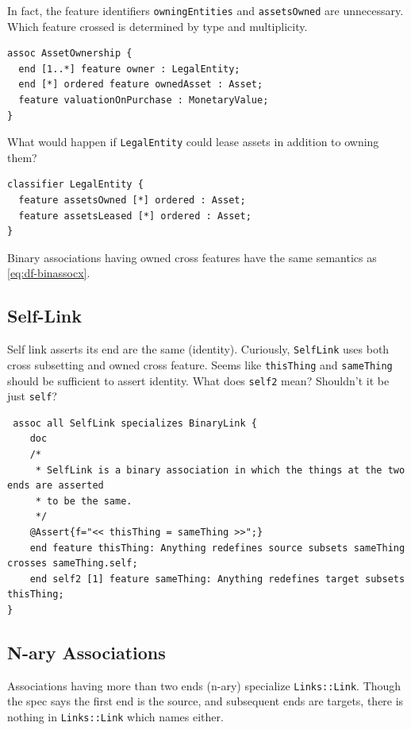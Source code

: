 \pn In fact, the feature identifiers \texttt{owningEntities} and \texttt{assetsOwned} are unnecessary.  
Which feature crossed is determined by type and multiplicity.

\begin{lstlisting}
assoc AssetOwnership {
  end [1..*] feature owner : LegalEntity;
  end [*] ordered feature ownedAsset : Asset;
  feature valuationOnPurchase : MonetaryValue;
}
\end{lstlisting}

\pn What would happen if \texttt{LegalEntity} could lease assets in addition to owning them?

\begin{lstlisting}
classifier LegalEntity {
  feature assetsOwned [*] ordered : Asset;
  feature assetsLeased [*] ordered : Asset;
}
\end{lstlisting}

\pn Binary associations having owned cross features have the same semantics as \ref{eq:df-binassocx}.


\subsection{Self-Link}

\pn Self link asserts its end are the same (identity).  Curiously, \texttt{SelfLink} uses both cross subsetting and owned cross feature.
Seems like \texttt{thisThing} and \texttt{sameThing} should be sufficient to assert identity.  What does \texttt{self2} mean?
Shouldn't it be just \texttt{self}?

\begin{lstlisting}
 assoc all SelfLink specializes BinaryLink {
    doc
    /*
     * SelfLink is a binary association in which the things at the two ends are asserted
     * to be the same.
     */      
    @Assert{f="<< thisThing = sameThing >>";}
    end feature thisThing: Anything redefines source subsets sameThing crosses sameThing.self;
    end self2 [1] feature sameThing: Anything redefines target subsets thisThing;
}
\end{lstlisting}

\subsection{N-ary Associations}\label{sec:naryassoc}

\pn Associations having more than two ends (n-ary) specialize \texttt{Links::Link}.  Though the spec says the first end is the source, and subsequent ends are targets, there is nothing in \texttt{Links::Link} which names either.

